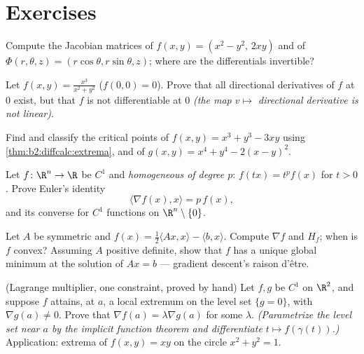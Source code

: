 \section{Exercises}

\begin{exercise}[$\star$]\label{exo:b2:diffcalc:1}
Compute the Jacobian matrices of $f(x,y) = (x^2 - y^2,\, 2xy)$ and
of $\Phi(r,\theta,z) = (r\cos\theta, r\sin\theta, z)$; where are
the differentials invertible?
\end{exercise}

\begin{exercise}[$\star$]\label{exo:b2:diffcalc:2}
Let $f(x,y) = \frac{x^3}{x^2 + y^2}$ ($f(0,0) = 0$). Prove that all
directional derivatives of $f$ at $0$ exist, but that $f$ is not
differentiable at $0$ \emph{(the map $v \mapsto$ directional
derivative is not linear)}.
\end{exercise}

\begin{exercise}[$\star$]\label{exo:b2:diffcalc:3}
Find and classify the critical points of $f(x, y) = x^3 + y^3 -
3xy$ using \cref{thm:b2:diffcalc:extrema}, and of $g(x,y) = x^4 +
y^4 - 2(x - y)^2$.
\end{exercise}

\begin{exercise}[$\star\star$]\label{exo:b2:diffcalc:4}
Let $f \colon \R^n \to \R$ be $C^1$ and \emph{homogeneous of degree
$p$}: $f(tx) = t^pf(x)$ for $t > 0$. Prove Euler's identity
\[
\langle \nabla f(x), x\rangle = p\,f(x) ,
\]
and its converse for $C^1$ functions on $\R^n\setminus\{0\}$.
\end{exercise}

\begin{exercise}[$\star\star$]\label{exo:b2:diffcalc:5}
Let $A$ be symmetric and $f(x) = \frac12\langle Ax, x\rangle -
\langle b, x\rangle$. Compute $\nabla f$ and $H_f$; when is $f$
convex? Assuming $A$ positive definite, show that $f$ has a unique
global minimum at the solution of $Ax = b$ --- gradient descent's
raison d'\^etre.
\end{exercise}

\begin{exercise}[$\star\star$]\label{exo:b2:diffcalc:6}
(Lagrange multiplier, one constraint, proved by hand) Let $f, g$ be
$C^1$ on $\R^2$, and suppose $f$ attains, at $a$, a local extremum
on the level set $\{g = 0\}$, with $\nabla g(a) \neq 0$. Prove that
$\nabla f(a) = \lambda\nabla g(a)$ for some $\lambda$.
\emph{(Parametrize the level set near $a$ by the implicit function
theorem and differentiate $t \mapsto f(\gamma(t))$.)} Application:
extrema of $f(x,y) = xy$ on the circle $x^2 + y^2 = 1$.
\end{exercise}

